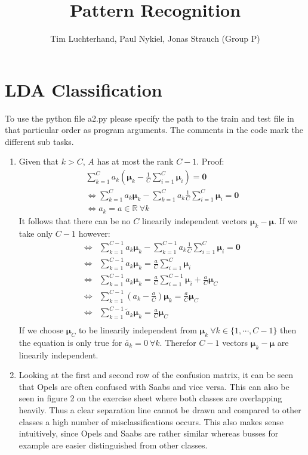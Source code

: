 \documentclass[DIN, pagenumber=false, fontsize=11pt, parskip=half]{scrartcl}
\title{Pattern Recognition}
\author{Tim Luchterhand, Paul Nykiel, Jonas Strauch (Group P)}
\newcommand{\R}[0]{\mathbb{R}}
\begin{document}
    \maketitle
    \section{LDA Classification}
    To use the python file a2.py please specify the path to the train and test file in that particular order as program arguments.
    The comments in the code mark the different sub tasks.
    \begin{enumerate}
        \item Given that $k > C$, $A$ has at most the rank $C-1$. Proof:
        \begin{align*}
            \sum_{k=1}^C a_k \left(\bm{\mu}_k - \frac{1}{C}\sum_{i=1}^C \bm{\mu}_i\right) = \mathbf{0} \\
            \Leftrightarrow \sum_{k=1}^C a_k \bm{\mu}_k - \sum_{k=1}^C a_k \frac{1}{C}\sum_{i=1}^C \bm{\mu}_i = \mathbf{0} \\
            \Leftrightarrow a_k = a \in \R \ \forall k
        \end{align*}
        It follows that there can be no $C$ linearily independent vectors $\bm{\mu}_k - \bm{\mu}$. If we take only $C-1$ however:
        \begin{align*}
            \Leftrightarrow &\sum_{k=1}^{C-1} a_k \bm{\mu}_k - \sum_{k=1}^{C-1} a_k \frac{1}{C}\sum_{i=1}^C \bm{\mu}_i = \mathbf{0} \\
            \Leftrightarrow &\sum_{k=1}^{C-1} a_k \bm{\mu}_k = \frac{a}{C} \sum_{i=1}^C \bm{\mu}_i \\
            \Leftrightarrow &\sum_{k=1}^{C-1} a_k \bm{\mu}_k = \frac{a}{C} \sum_{i=1}^{C-1} \bm{\mu}_i + \frac{a}{C} \bm{\mu}_C \\
            \Leftrightarrow &\sum_{k=1}^{C-1} \left(a_k - \frac{a}{C}\right) \bm{\mu}_k = \frac{a}{C} \bm{\mu}_C \\
            \Leftrightarrow &\sum_{k=1}^{C-1} \widetilde{a}_k \bm{\mu}_k = \frac{a}{C} \bm{\mu}_C \\
        \end{align*}
        If we choose $\bm{\mu}_C$ to be linearily independent from $\bm{\mu}_k \ \forall k \in \{1, \cdots, C-1\}$ then the equation is
        only true for $\widetilde{a_k} = 0 \ \forall k$. Therefor $C-1$ vectors $\bm{\mu}_k - \bm{\mu}$ are linearily independent.
        \setcounter{enumi}{4}
        \item Looking at the first and second row of the confusion matrix, it can be seen that Opels are often confused with Saabs
        and vice versa. This can also be seen in figure 2 on the exercise sheet where both classes are overlapping heavily. Thus
        a clear separation line cannot be drawn and compared to other classes a high number of misclassifications occurs. This also
        makes sense intuitively, since Opels and Saabs are rather similar whereas busses for example are easier distinguished from
        other classes.
    \end{enumerate}
\end{document}
